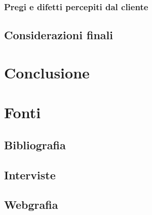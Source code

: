 \documentclass{article}
\begin{document}
\subsubsection{Pregi e difetti percepiti dal cliente}

\subsection{Considerazioni finali}

\newpage
\section{Conclusione}

\newpage
\section{Fonti}
\subsection{Bibliografia}

\subsection{Interviste}

\subsection{Webgrafia}

\end{document}
